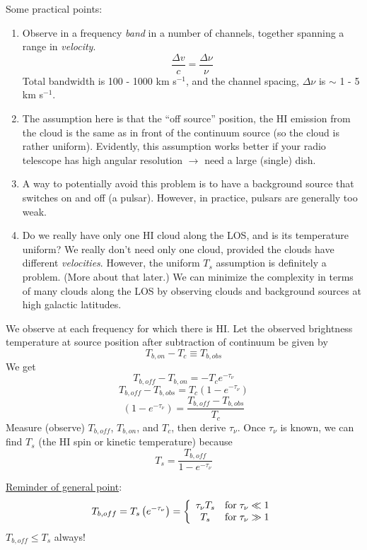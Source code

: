 \documentclass[11pt]{article}
\newcommand{\mar}[1]{\hspace{0pt}\marginpar{-\textcolor{black}{#1}-}}
\begin{document}
Some practical points:
\begin{enumerate}
    \item Observe in a frequency \textit{band} in a number of channels,
        together spanning a range in \textit{velocity}.
        \[
            \frac{\Delta{v}}{c} = \frac{\Delta\nu}{\nu}
            \]
        Total bandwidth is 100 - 1000 km s$^{-1}$, and the channel spacing,
        $\Delta\nu$ is $\sim$ 1 - 5 km s$^{-1}$.
    \item The assumption here is that the ``off source'' position, the HI
        emission from the cloud is the same as in front of the continuum
        source (so the cloud is rather uniform). Evidently, this assumption
        works better if your radio telescope has high angular resolution
        $\rightarrow$ need a large (single) dish.
    \item A way to potentially avoid this problem is to have a background
        source that switches on and off (a pulsar). However, in practice,
        pulsars are generally too weak.
    \item Do we really have only one HI cloud along the LOS, and is
        its temperature uniform? We really don't need only one cloud,
        provided the clouds have different \emph{velocities}.
        However, the uniform $T_{s}$ assumption is definitely a problem.
        (More about that later.) We can minimize the complexity in terms of
        many clouds along the LOS by observing clouds and background
        sources at high galactic latitudes.
\end{enumerate}

\mar{43}We observe at each frequency for which there is HI.
Let the observed brightness temperature at source position after subtraction of
continuum be given by
\[
    T_{b, on} - T_{c} \equiv T_{b, obs}
    \]
We get
\[
    T_{b, off} - T_{b, on} = -T_{c} e^{-\tau_{\nu}}
    \]
\[
    T_{b, off} - T_{b, obs} = T_{c} \left( 1 - e^{-\tau_{\nu}} \right)
    \]
\[
    \left( 1 - e^{-\tau_{\nu}} \right) = \frac{T_{b, off} - T_{b, obs}}{T_{c}}
    \]
Measure (observe) $T_{b, off}$, $T_{b, on}$, and $T_{c}$, then derive
$\tau_{\nu}$. Once $\tau_{\nu}$ is known, we can find $T_{s}$
(the HI spin or kinetic temperature) because
\[
    T_{s} = \frac{T_{b,off}}{1 - e^{-\tau_{\nu}}}
    \]


\underline{Reminder of general point}:
\[
    T_{b,off} = T_{s} \left( e^{-\tau_{\nu}} \right) = \left\{
    \begin{array}{c l}
        \tau_{\nu}T_{s} & \mathrm{for}\; \tau_{\nu} \ll 1\\
        T_{s} & \mathrm{for}\; \tau_{\nu} \gg 1\\
    \end{array}\right.
    \]
\textcolor{bred}{$T_{b,off} \leq T_{s}$} always!
\end{document}
